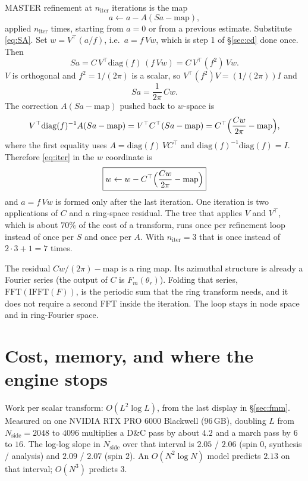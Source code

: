 \documentclass[11pt,a4paper]{article}
\numberwithin{equation}{section}
\begin{document}
MASTER refinement at $n_{\mathrm{iter}}$ iterations is the map
\begin{equation}
  a \leftarrow a - A(Sa - \mathrm{map}),
  \label{eq:iter}
\end{equation}
applied $n_{\mathrm{iter}}$ times, starting from $a=0$ or from a previous estimate.
Substitute \eqref{eq:SA}. Set $w=V^\top(a/f)$, i.e.\ $a=f\,Vw$, which is step 1 of
\S\ref{sec:cd} done once. Then
\[
  Sa = C\, V^\top \mathrm{diag}(f)\, (f\, V w) = C\, V^\top (f^2)\, V w.
\]
$V$ is orthogonal and $f^2=1/(2\pi)$ is a scalar, so $V^\top (f^2) V=(1/(2\pi))I$ and
\[
  Sa = \frac{1}{2\pi}\, C w.
\]
The correction $A(Sa-\mathrm{map})$ pushed back to $w$-space is
\[
  V^\top \mathrm{diag}(f)^{-1} A(Sa-\mathrm{map})
  = V^\top C^\top (Sa-\mathrm{map})
  = C^\top\Bigl(\frac{Cw}{2\pi}-\mathrm{map}\Bigr),
\]
where the first equality uses $A=\mathrm{diag}(f)\, V C^\top$ and $\mathrm{diag}(f)^{-1}\mathrm{diag}(f)=I$.
Therefore \eqref{eq:iter} in the $w$ coordinate is
\begin{equation}
  \boxed{ w \leftarrow w - C^\top\Bigl(\frac{Cw}{2\pi} - \mathrm{map}\Bigr) }
  \label{eq:witer}
\end{equation}
and $a=f\,Vw$ is formed only after the last iteration.
One iteration is two applications of $C$ and a ring-space residual. The tree that applies
$V$ and $V^\top$, which is about $70\%$ of the cost of a transform, runs once per refinement
loop instead of once per $S$ and once per $A$. With $n_{\mathrm{iter}}=3$ that is once
instead of $2\cdot 3+1=7$ times.

The residual $Cw/(2\pi)-\mathrm{map}$ is a ring map. Its azimuthal structure is already a
Fourier series (the output of $C$ is $F_m(\theta_r)$). Folding that series,
$\mathrm{FFT}(\mathrm{IFFT}(F))$, is the periodic sum that the ring transform needs, and it
does not require a second FFT inside the iteration. The loop stays in node space and in
ring-Fourier space.

\section{Cost, memory, and where the engine stops}
\label{sec:cost}

Work per scalar transform: $O(L^2\log L)$, from the last display in \S\ref{sec:fmm}.
Measured on one NVIDIA RTX PRO 6000 Blackwell (96\,GB), doubling $L$ from $N_{\mathrm{side}}=2048$ to $4096$
multiplies a D\&C pass by about $4.2$ and a march pass by $6$ to $16$. The log-log slope
in $N_{\mathrm{side}}$ over that interval is $2.05$ / $2.06$ (spin $0$, synthesis /
analysis) and $2.09$ / $2.07$ (spin $2$). An $O(N^2\log N)$ model predicts $2.13$ on that
interval; $O(N^3)$ predicts $3$.
\end{document}
